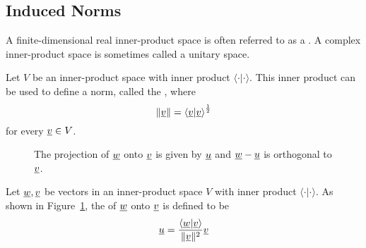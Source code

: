 \subsection{Induced Norms}


A finite-dimensional real inner-product space is often referred to as a .
A complex inner-product space is sometimes called a unitary space.

\begin{definition}
Let $V$ be an inner-product space with inner product $\langle \cdot | \cdot \rangle$.
This inner product can be used to define a norm, called the , where
\begin{equation*}
\left\| \underline{v} \right\| = \left\langle \underline{v} | \underline{v} \right\rangle^{\frac{1}{2}}
\end{equation*}
for every $\underline{v} \in V$.
\end{definition}

\begin{figure}
\centering
{}
\caption{\label{fig:vector_projection}The projection of $\underline{w}$ onto $\underline{v}$ is given by $\underline{u}$ and $\underline{w}-\underline{u}$ is orthogonal to $\underline{v}$.}
\end{figure}

\begin{definition}
Let $\underline{w},\underline{v}$ be vectors in an inner-product space $V$ with inner product $\langle \cdot | \cdot \rangle$.
As shown in Figure~\ref{fig:vector_projection}, the  of $\underline{w}$ onto $\underline{v}$ is defined to be
\begin{equation*}
\underline{u} = \frac{\left\langle \underline{w} | \underline{v} \right\rangle}{\|\underline{v}\|^2} \underline{v}
\end{equation*}
\end{definition}

